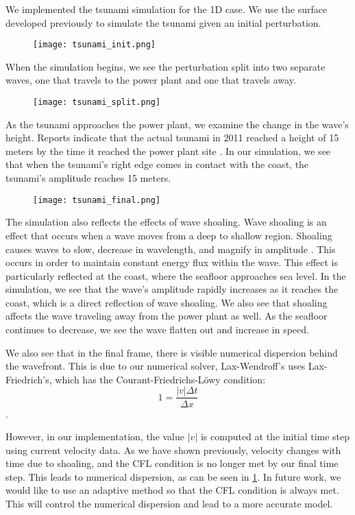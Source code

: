 \documentclass[../main.tex]{subfiles}
\begin{document}
We implemented the tsunami simulation for the 1D case.  We use the surface developed previously to simulate the tsunami given an initial perturbation. 

\begin{figure}[H]
\centering
\texttt{[image: tsunami\_init.png]}
\end{figure}

\noindent When the simulation begins, we see the perturbation split into two separate waves, one that travels to the power plant and one that travels away.

\begin{figure}[H]
\centering
\texttt{[image: tsunami\_split.png]}
\end{figure}


\noindent As the tsunami approaches the power plant, we examine the change in the wave's height.  Reports indicate that the actual tsunami in 2011 reached a height of 15 meters by the time it reached the power plant site \cite{nuclearAssociation}.  In our simulation, we see that when the tsunami's right edge comes in contact with the coast, the tsunami's amplitude reaches 15 meters.

\begin{figure}[H]
\label{tsunamiFinal}
\centering
\texttt{[image: tsunami\_final.png]}
\end{figure}

\noindent The simulation also reflects the effects of wave shoaling.  Wave shoaling is an effect that occurs when a wave moves from a deep to shallow region.  Shoaling causes waves to slow, decrease in wavelength, and magnify in amplitude \cite{shoaling}.  This occurs in order to maintain constant energy flux within the wave.  This effect is particularly reflected at the coast, where the seafloor approaches sea level.  In the simulation, we see that the wave's amplitude rapidly increases as it reaches the
coast, which is a direct reflection of wave shoaling.  We also see that shoaling affects the wave traveling away from the power plant as well.  As the seafloor continues to decrease, we see the wave flatten out and increase in speed. \newline


\noindent We also see that in the final frame, there is visible numerical dispersion behind the wavefront.  This is due to our numerical solver, Lax-Wendroff's uses Lax-Friedrich's, which has the Courant-Friedrichs-L\"owy condition:
$$ 1 = \frac{|v|\Delta t}{\Delta x}$$.

\noindent However, in our implementation, the value $|v|$ is computed at the initial time step using current velocity data.  As we have shown previously, velocity changes with time due to shoaling, and the CFL condition is no longer met by our final time step.  This leads to numerical dispersion, as can be seen in \ref{tsunamiFinal}.  In future work, we would like to use an adaptive method so that the CFL condition is always met.  This will control the numerical dispersion and lead to a more accurate model.
\end{document}
